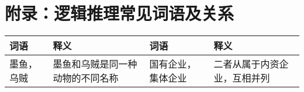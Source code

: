 \section{附录：逻辑推理常见词语及关系}
\label{trd:appendix}

\begin{longtable}{|p{}|p{}|p{}|p{}|}
    \hline
    \textbf{词语} & \textbf{释义}      & \textbf{词语} & \textbf{释义}    \\
    \hline
    墨鱼，乌贼       & 墨鱼和乌贼是同一种动物的不同名称 & 国有企业，集体企业   & 二者从属于内资企业，互相并列 \\
    \hline

\end{longtable}